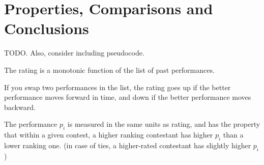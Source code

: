 \documentclass{article}
\begin{document}
\section{Properties, Comparisons and Conclusions}

TODO. Also, consider including pseudocode.

The rating is a monotonic function of the list of past performances.

If you swap two performances in the list, the rating goes up if the better performance moves forward in time, and down if the better performance moves backward.

The performance $p_i$ is measured in the same units as rating, and has the property that within a given contest, a higher ranking contestant has higher $p_i$ than a lower ranking one. (in case of ties, a higher-rated contestant has slightly higher $p_i$)



\end{document}

